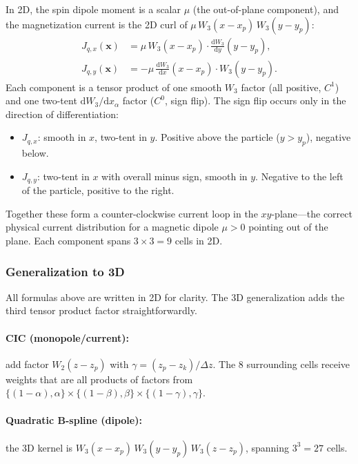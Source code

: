 \documentclass[11pt,a4paper]{article}
\newcommand{\vv}[1]{\mathbf{#1}}
\newcommand{\dd}{\mathrm{d}}
\begin{document}
In 2D, the spin dipole moment is a scalar $\mu$ (the out-of-plane component), and the magnetization current is the 2D curl of $\mu\,W_3(x-x_p)\,W_3(y-y_p)$:
\begin{align}
  J_{q,x}(\vv{x}) &= \mu\,W_3(x-x_p)\cdot\frac{\dd W_3}{\dd y}(y-y_p), \label{eq:curl2d_x}\\
  J_{q,y}(\vv{x}) &= -\mu\,\frac{\dd W_3}{\dd x}(x-x_p)\cdot W_3(y-y_p). \label{eq:curl2d_y}
\end{align}
Each component is a tensor product of one smooth $W_3$ factor (all positive, $C^1$) and one two-tent $\dd W_3/\dd x_\alpha$ factor ($C^0$, sign flip).  The sign flip occurs only in the direction of differentiation:
\begin{itemize}
  \item $J_{q,x}$: smooth in $x$, two-tent in $y$.  Positive above the particle ($y>y_p$), negative below.
  \item $J_{q,y}$: two-tent in $x$ with overall minus sign, smooth in $y$.  Negative to the left of the particle, positive to the right.
\end{itemize}
Together these form a counter-clockwise current loop in the $xy$-plane---the correct physical current distribution for a magnetic dipole $\mu>0$ pointing out of the plane.  Each component spans $3\times 3 = 9$ cells in 2D.

\subsubsection*{Generalization to 3D}

All formulas above are written in 2D for clarity.  The 3D generalization adds the third tensor product factor straightforwardly.

\paragraph{CIC (monopole/current):} add factor $W_2(z-z_p)$ with $\gamma=(z_p-z_k)/\Delta z$.  The 8 surrounding cells receive weights that are all products of factors from $\{(1-\alpha),\alpha\}\times\{(1-\beta),\beta\}\times\{(1-\gamma),\gamma\}$.

\paragraph{Quadratic B-spline (dipole):} the 3D kernel is $W_3(x-x_p)\,W_3(y-y_p)\,W_3(z-z_p)$, spanning $3^3=27$ cells.
\end{document}
